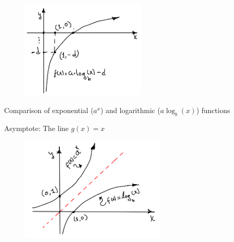 \begin{multicols}{2}
    \begin{figure}[H]
        \centering
        \includegraphics[width=6cm]{images/fig12}
    \end{figure}
    \hline
    \begin{center}
        Comparison of exponential ($a^x$) and logarithmic ($a \log_b (x)$) functions

        Asymptote: The line $g(x) = x$ \\
        \vspace{12mm}
        \hline
    \end{center}
    \begin{figure}[H]
        \centering
        \includegraphics[width=7cm]{images/fig0}
    \end{figure}
\end{multicols}